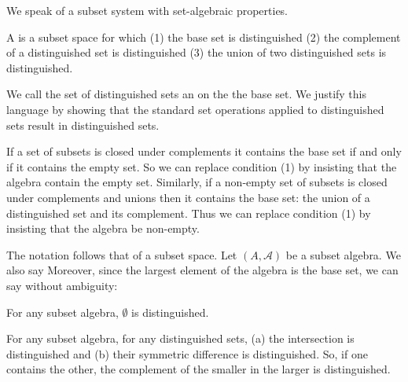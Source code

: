
\sbasic


















\sstart
{}


We speak of a subset
system
with set-algebraic
properties.


A 
is a subset space for which
(1) the base set is distinguished
(2) the complement of a distinguished
set is distinguished
(3) the union of two distinguished sets
is distinguished.

We call the set of distinguished sets
an  on the the base set.
We justify this
language by showing that the standard set
operations applied to distinguished sets
result in distinguished sets.

If a set of subsets is closed under complements
it contains the base set
if and only if
it contains the empty set.
So we can replace condition (1) by insisting
that the algebra contain the empty set.
Similarly, if a non-empty set of subsets
is closed under complements and unions
then it contains the base set: the union
of a distinguished set and its complement.
Thus we can replace condition (1) by insisting
that the algebra be non-empty.


The notation follows that of a subset space.
Let $(A, \mathcal{A})$ be a subset algebra.
We also say 
Moreover, since the largest element of the
algebra is the base set, we can say without
ambiguity: 


\begin{prop}
  For any subset algebra, $\emptyset$ is distinguished.
\end{prop}

\begin{prop}
  For any subset algebra,
  for any distinguished sets,
  (a) the intersection is distinguished and
  (b) their symmetric difference is distinguished.
  So, if one contains the other, the complement
  of the smaller in the larger is distinguished.
\end{prop}

